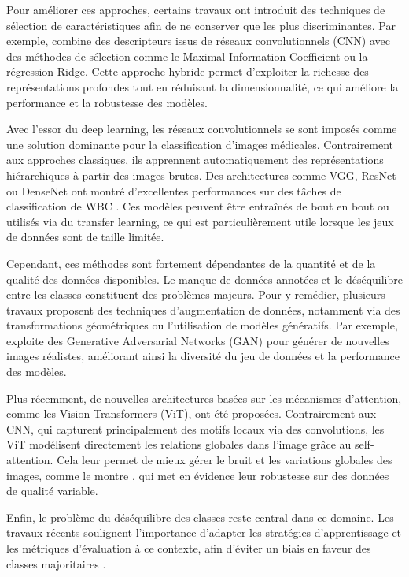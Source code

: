 \documentclass[journal,twocolumn]{IEEEtran}
\begin{document}
Pour améliorer ces approches, certains travaux ont introduit des techniques de sélection de caractéristiques afin de ne conserver que les plus discriminantes. Par exemple, \cite{TOGACAR2020106810} combine des descripteurs issus de réseaux convolutionnels (CNN) avec des méthodes de sélection comme le Maximal Information Coefficient ou la régression Ridge. Cette approche hybride permet d’exploiter la richesse des représentations profondes tout en réduisant la dimensionnalité, ce qui améliore la performance et la robustesse des modèles.

Avec l’essor du deep learning, les réseaux convolutionnels se sont imposés comme une solution dominante pour la classification d’images médicales. Contrairement aux approches classiques, ils apprennent automatiquement des représentations hiérarchiques à partir des images brutes. Des architectures comme VGG, ResNet ou DenseNet ont montré d’excellentes performances sur des tâches de classification de WBC \cite{https://doi.org/10.1155/2020/6490479}. Ces modèles peuvent être entraînés de bout en bout ou utilisés via du transfer learning, ce qui est particulièrement utile lorsque les jeux de données sont de taille limitée.

Cependant, ces méthodes sont fortement dépendantes de la quantité et de la qualité des données disponibles. Le manque de données annotées et le déséquilibre entre les classes constituent des problèmes majeurs. Pour y remédier, plusieurs travaux proposent des techniques d’augmentation de données, notamment via des transformations géométriques ou l’utilisation de modèles génératifs. Par exemple, \cite{https://doi.org/10.1155/2020/6490479} exploite des Generative Adversarial Networks (GAN) pour générer de nouvelles images réalistes, améliorant ainsi la diversité du jeu de données et la performance des modèles.

Plus récemment, de nouvelles architectures basées sur les mécanismes d’attention, comme les Vision Transformers (ViT), ont été proposées. Contrairement aux CNN, qui capturent principalement des motifs locaux via des convolutions, les ViT modélisent directement les relations globales dans l’image grâce au self-attention. Cela leur permet de mieux gérer le bruit et les variations globales des images, comme le montre \cite{a16110525}, qui met en évidence leur robustesse sur des données de qualité variable.

Enfin, le problème du déséquilibre des classes reste central dans ce domaine. Les travaux récents soulignent l’importance d’adapter les stratégies d’apprentissage et les métriques d’évaluation à ce contexte, afin d’éviter un biais en faveur des classes majoritaires \cite{Gao_2026,healthcare10112230}.
\end{document}
